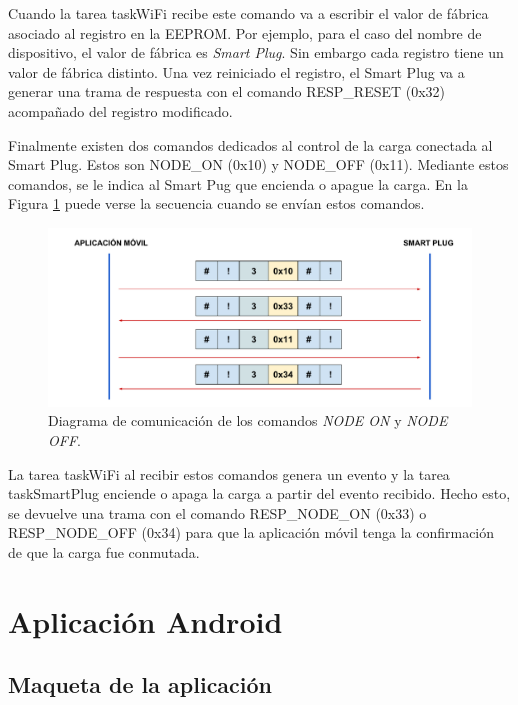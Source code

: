 Cuando la tarea taskWiFi recibe este comando va a escribir el valor de fábrica asociado al registro en la EEPROM. Por ejemplo, para el caso del nombre de dispositivo, el valor de fábrica es \textit{Smart Plug}. Sin embargo cada registro tiene un valor de fábrica distinto. Una vez reiniciado el registro, el Smart Plug va a generar una trama de respuesta con el comando RESP\_RESET (0x32) acompañado del registro modificado.

Finalmente existen dos comandos dedicados al control de la carga conectada al Smart Plug. Estos son NODE\_ON (0x10) y NODE\_OFF (0x11). Mediante estos comandos, se le indica al Smart Pug que encienda o apague la carga. En la Figura \ref{fig:comunicacion_node} puede verse la secuencia cuando se envían estos comandos.

\begin{figure}[h]
	\centering
	\includegraphics[width=14cm]{./Figures/3_2_5_comunicacion_NODE.pdf}
	\caption{Diagrama de comunicación de los comandos \textit{NODE ON} y \textit{NODE OFF}.}
	\label{fig:comunicacion_node}
\end{figure}

La tarea taskWiFi al recibir estos comandos genera un evento y la tarea taskSmartPlug enciende o apaga la carga a partir del evento recibido. Hecho esto, se devuelve una trama con el comando RESP\_NODE\_ON (0x33) o RESP\_NODE\_OFF (0x34) para que la aplicación móvil tenga la confirmación de que la carga fue conmutada.


\section{Aplicación Android}
\label{section:app}

\subsection{Maqueta de la aplicación}
\label{subsec:app_wireframe}

